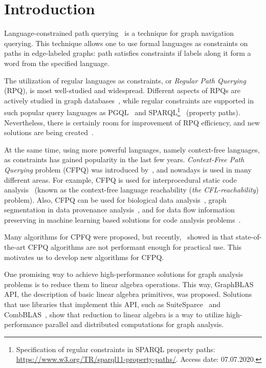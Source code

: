 \section{Introduction}


Language-constrained path querying~\citep{barrett2000formal} is a technique for graph navigation querying.
This technique allows one to use formal languages as constraints on paths in edge-labeled graphs: path satisfies constraints if labels along it form a word from the specified language.

The utilization of regular languages as constraints, or \textit{Regular Path Querying} (RPQ), is most well-studied and widespread.
Different aspects of RPQs are actively studied in graph databases~\citep{10.1145/2463664.2465216, 10.1145/3104031,10.1145/2850413}, while regular constraints are supported in such popular query languages as PGQL~\citep{10.1145/2960414.2960421} and SPARQL\footnote{Specification of regular constraints in SPARQL property paths: \url{https://www.w3.org/TR/sparql11-property-paths/}. Access date: 07.07.2020.}~\citep{10.1007/978-3-319-25007-6_1} (property paths).
Nevertheless, there is certainly room for improvement of RPQ efficiency, and new solutions are being created~\citep{Wang2019,10.1145/2949689.2949711}.

At the same time, using more powerful languages, namely context-free languages, as constraints has gained popularity in the last few years.
\textit{Context-Free Path Querying} problem (CFPQ) was introduced by~\cite{Yannakakis}, and nowadays is used in many different areas. For example, CFPQ is used for interprocedural static code analysis~\citep{10.1145/3158118,10.5555/271338.271343, YanSCA, Zheng:2008:DAA:1328897.1328464} (known as the context-free language reachability (\textit{the CFL-reachability}) problem). Also, CFPQ can be used for biological data analysis~\citep{GraphQueryWithEarley}, graph segmentation in data provenance analysis~\citep{8731467}, and for data flow information preserving in machine learning based solutions for code analysis problems~\citep{10.1145/3428301}. 

Many algorithms for CPFQ were proposed, but recently,~\cite{Kuijpers:2019:ESC:3335783.3335791} showed in that state-of-the-art CFPQ algorithms are not performant enough for practical use. 
This motivates us to develop new algorithms for CFPQ.

One promising way to achieve high-performance solutions for graph analysis problems is to reduce them to linear algebra operations.
This way, GraphBLAS~\citep{7761646} API, the description of basic linear algebra primitives, was proposed.
Solutions that use libraries that implement this API, such as SuiteSparce~\citep{10.1145/3322125} and CombBLAS~\citep{10.1177/1094342011403516}, show that reduction to linear algebra is a way to utilize high-performance parallel and distributed computations for graph analysis.

